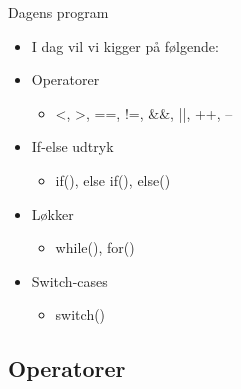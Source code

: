 \documentclass{beamer}
\begin{document}
\begin{frame}[fragile]{Dagens program}
	\begin{itemize}
		\item{I dag vil vi kigger på følgende:}
		\item{Operatorer}
		\begin{itemize}
			\item{{\color{dkgreen}<}, {\color{dkgreen}>}, {\color{dkgreen}==}, {\color{dkgreen}!=}, {\color{dkgreen}\&\&}, {\color{dkgreen}||}, {\color{dkgreen}++}, {\color{dkgreen}--}}
		\end{itemize}
		\item{If-else udtryk}
		\begin{itemize}
			\item{{\color{C_darkblue}if}(), {\color{C_darkblue}else if}(), {\color{C_darkblue}else}()}
		\end{itemize}
		\item{Løkker}
		\begin{itemize}
			\item{{\color{C_darkblue}while}(), {\color{C_darkblue}for}()}
		\end{itemize}
		\item{Switch-cases}
		\begin{itemize}
			\item{{\color{C_darkblue}switch}()}
		\end{itemize}
	\end{itemize}
\end{frame}

\subsection{Operatorer}
\end{document}
